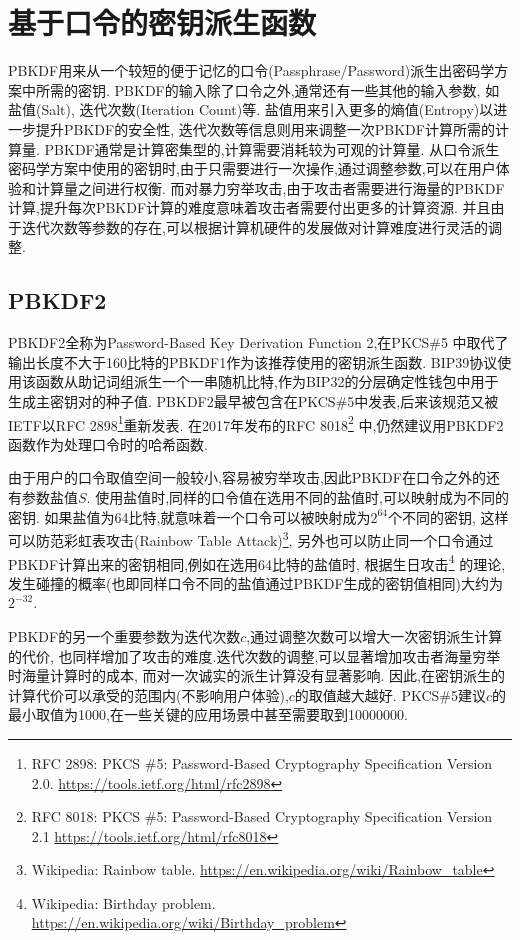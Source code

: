 
\section{基于口令的密钥派生函数}

PBKDF用来从一个较短的便于记忆的口令(Passphrase/Password)派生出密码学方案中所需的密钥.
PBKDF的输入除了口令之外,通常还有一些其他的输入参数, 如盐值(Salt), 迭代次数(Iteration Count)等.
盐值用来引入更多的熵值(Entropy)以进一步提升PBKDF的安全性, 迭代次数等信息则用来调整一次PBKDF计算所需的计算量.
PBKDF通常是计算密集型的,计算需要消耗较为可观的计算量.
从口令派生密码学方案中使用的密钥时,由于只需要进行一次操作,通过调整参数,可以在用户体验和计算量之间进行权衡.
而对暴力穷举攻击,由于攻击者需要进行海量的PBKDF计算,提升每次PBKDF计算的难度意味着攻击者需要付出更多的计算资源.
并且由于迭代次数等参数的存在,可以根据计算机硬件的发展做对计算难度进行灵活的调整.

\subsection{PBKDF2}
PBKDF2全称为Password-Based Key Derivation Function 2,在PKCS\#5
中取代了输出长度不大于160比特的PBKDF1作为该推荐使用的密钥派生函数.
BIP39协议使用该函数从助记词组派生一个一串随机比特,作为BIP32的分层确定性钱包中用于生成主密钥对的种子值.
PBKDF2最早被包含在PKCS\#5中发表,后来该规范又被IETF以RFC 
2898\footnote{
RFC 2898: PKCS \#5: Password-Based Cryptography Specification Version 2.0.
\url{https://tools.ietf.org/html/rfc2898}}重新发表.
在2017年发布的RFC 8018\footnote{
RFC 8018: PKCS \#5: Password-Based Cryptography Specification Version 2.1 \url{https://tools.ietf.org/html/rfc8018}}
中,仍然建议用PBKDF2函数作为处理口令时的哈希函数.

由于用户的口令取值空间一般较小,容易被穷举攻击,因此PBKDF在口令之外的还有参数盐值$S$.
使用盐值时,同样的口令值在选用不同的盐值时,可以映射成为不同的密钥.
如果盐值为64比特,就意味着一个口令可以被映射成为$2^{64}$个不同的密钥,
这样可以防范彩虹表攻击(Rainbow Table Attack)\footnote{
Wikipedia: Rainbow table. \url{https://en.wikipedia.org/wiki/Rainbow_table}},
另外也可以防止同一个口令通过PBKDF计算出来的密钥相同,例如在选用64比特的盐值时,
根据生日攻击\footnote{
Wikipedia: Birthday problem. \url{https://en.wikipedia.org/wiki/Birthday_problem}}
的理论,发生碰撞的概率(也即同样口令不同的盐值通过PBKDF生成的密钥值相同)大约为$2^{-32}$.

PBKDF的另一个重要参数为迭代次数$c$,通过调整次数可以增大一次密钥派生计算的代价,
也同样增加了攻击的难度.迭代次数的调整,可以显著增加攻击者海量穷举时海量计算时的成本,
而对一次诚实的派生计算没有显著影响.
因此,在密钥派生的计算代价可以承受的范围内(不影响用户体验),$c$的取值越大越好.
PKCS\#5建议$c$的最小取值为1000,在一些关键的应用场景中甚至需要取到10000000.

